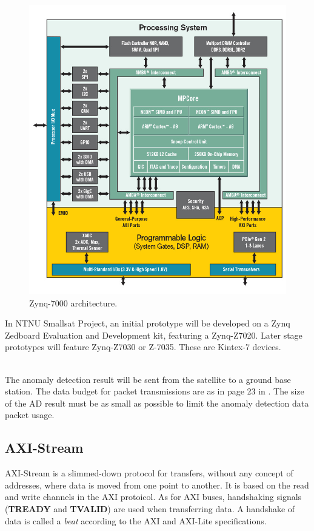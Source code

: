 \begin{figure}[H]
\centering
   \includegraphics[scale=0.3]{images/zynq-mp-core-dual.png}
  \caption{ Zynq-7000 architecture\cite{cite:zynq_7000}. } 
  \label{fig:zynq_7000}
\end{figure}
 In NTNU Smallsat Project, an initial prototype will be developed on a Zynq Zedboard Evaluation and Development kit, featuring a Zynq-Z7020. Later stage prototypes will feature Zynq-Z7030 or Z-7035. These are Kintex-7 devices. 

\\
The anomaly detection result will be sent from the satellite to a ground base station. The data budget for packet transmissions are as in page 23 in \cite{SmallSat_project_description}. The size of the AD result must be as small as possible to limit the anomaly detection data packet usage.  

\subsection{AXI-Stream}
AXI-Stream is a slimmed-down protocol for transfers, without any concept of addresses, where data is moved from one point to another. It is based on the read and write channels in the AXI protoicol. As for AXI buses, handshaking signals (\textbf{TREADY} and \textbf{TVALID}) are used when transferring data. A handshake of data is called a \textit{beat} according to the AXI and AXI-Lite specifications. \\

